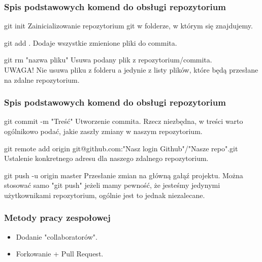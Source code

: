 \documentclass[9pt]{beamer}
\begin{document}
	\begin{frame}
		\frametitle{Spis podstawowych komend do obsługi repozytorium}
			\begin{block}{git init}
				Zainicializowanie repozytorium git w folderze, w którym się znajdujemy.
			\end{block}

			\begin{block}{git add .}
				Dodaje wszystkie zmienione pliki do commita.
			\end{block}
			
			\begin{block}{git rm "nazwa pliku"}
				Usuwa podany plik z repozytorium/commita. \\UWAGA! Nie usuwa pliku z folderu a jedynie z listy plików, które będą przesłane na zdalne repozytorium.
			\end{block}			


	\end{frame}

	
		
	\begin{frame}
		\frametitle{Spis podstawowych komend do obsługi repozytorium}

			\begin{block}{git commit -m "Treść"}
				Utworzenie commita. Rzecz niezbędna, w treści warto ogólnikowo podać, jakie zaszły zmiany w naszym repozytorium.
			\end{block}

			\begin{block}{git remote add origin git@github.com:"Nasz login Github"/"Nasze repo".git}
				Ustalenie konkretnego adresu dla naszego zdalnego repozytorium.
			\end{block}	

			\begin{block}{git push -u origin master}
				Przesłanie zmian na główną gałąź projektu. Można stosować samo "git push" jeżeli mamy pewność, że jesteśmy jedynymi użytkownikami repozytorium, ogólnie jest to jednak niezalecane.
			\end{block}	
			
					
						
	\end{frame}



	\begin{frame}
		\frametitle{Metody pracy zespołowej}
		\begin{itemize}
			\item Dodanie "collaboratorów".
			\item Forkowanie + Pull Request.
		\end{itemize}
	\end{frame}
\end{document}
